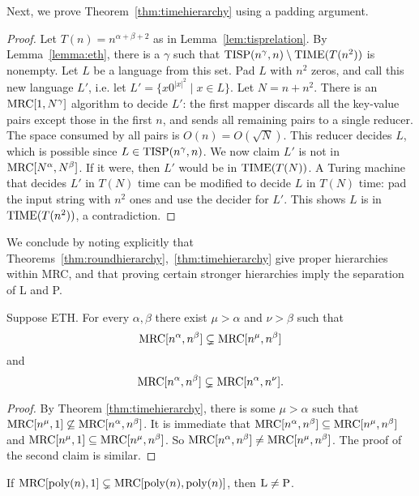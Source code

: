 \documentclass[letterpaper,USenglish]{lipics}
\theoremstyle{definition}
\theoremstyle{remark}
\newcommand{\mrc}{\textup{MRC}}
\newcommand{\TIME}{\textup{TIME}}
\newcommand{\TISP}{\textup{TISP}}
\renewcommand{\P}{\textup{P}}
\renewcommand{\L}{\textup{L}}
\begin{document}
Next, we prove Theorem~\ref{thm:timehierarchy} using a padding argument.

\begin{proof}
Let $T(n) = n^{\alpha + \beta + 2}$ as in Lemma~\ref{lem:tisprelation}. By
Lemma~\ref{lemma:eth}, there is a $\gamma$ such that $\TISP(n^\gamma,
n)\setminus\TIME(T(n^{2}))$ is nonempty.  Let $L$ be a language from this set.
Pad $L$ with $n^{2}$ zeros, and call this new language $L'$, i.e. let $L' = \{x
0^{|x|^{2}} \mid x \in  L\}$. Let $N = n + n^{2}$. There is an $\mrc[1,
N^\gamma]$ algorithm to decide $L'$: the first mapper discards all the
key-value pairs except those in the first $n$, and sends all remaining pairs to
a single reducer. The space consumed by all pairs is $O(n) = O(\sqrt{N})$. This
reducer decides $L$, which is possible since $L \in \TISP(n^\gamma, n)$. We now
claim $L'$ is not in $\mrc[N^\alpha, N^\beta]$. If it were, then $L'$ would be
in $\TIME(T(N))$. A Turing machine that decides $L'$ in $T(N)$ time can be
modified to decide $L$ in $T(N)$ time: pad the input string with $n^{2}$ ones
and use the decider for $L'$. This shows $L$ is in $\TIME(T(n^{2}))$, a
contradiction.  \end{proof}

We conclude by noting explicitly that
Theorems~\ref{thm:roundhierarchy},~\ref{thm:timehierarchy} give proper
hierarchies within MRC, and that proving certain stronger hierarchies imply the
separation of L and P.

\begin{corollary} \label{cor:mrchierarchy}
Suppose ETH. For every $\alpha, \beta$ there exist $\mu>\alpha$ and $\nu>\beta$
such that $$\mrc[n^\alpha, n^\beta] \subsetneq \mrc[n^\mu, n^\beta]$$ and
$$\mrc[n^\alpha, n^\beta] \subsetneq \mrc[n^\alpha, n^\nu].$$
\end{corollary}

\begin{proof}
By Theorem \ref{thm:timehierarchy}, there is some $\mu > \alpha$ such that
$\mrc[n^\mu, 1] \not\subseteq \mrc[n^\alpha, n^\beta]$.  It is immediate that
$\mrc[n^\alpha, n^\beta] \subseteq \mrc[n^\mu, n^\beta]$ and
$\mrc[n^\mu,1]\subseteq\mrc[n^\mu,n^\beta]$.  So $\mrc[n^\alpha,n^\beta]\neq
\mrc[n^\mu, n^\beta]$.  The proof of the second claim is similar.
\end{proof}


\begin{corollary} \label{cor:lvsp}
If $\mrc[\textup{poly}(n), 1] \subsetneq \mrc[\textup{poly}(n),
\textup{poly}(n)]$, then $\L \neq \P$.
\end{corollary}
\end{document}

